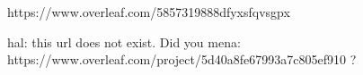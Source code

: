 https://www.overleaf.com/5857319888dfyxsfqvsgpx

hal: this url does not exist. Did you mena:
https://www.overleaf.com/project/5d40a8fe67993a7c805ef910 ?
